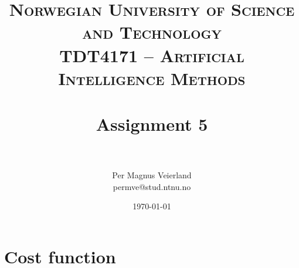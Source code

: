 

\usepackage{pgfplotstable}

\pgfplotsset{compat=1.5}



\newcommand{\errorband}[6]{
\pgfplotstableread{#1}\datatable
  \addplot [name path=pluserror,draw=none,no markers,forget plot]
    table [x={#2},y expr=\thisrow{#3}+\thisrow{#4}] {\datatable};

  \addplot [name path=minuserror,draw=none,no markers,forget plot]
    table [x={#2},y expr=\thisrow{#3}-\thisrow{#4}] {\datatable};

  \addplot [forget plot,fill=#5,opacity=#6]
    fill between[on layer={},of=pluserror and minuserror];

}

\title{
\normalfont \normalsize
\textsc{Norwegian University of Science and Technology\\TDT4171 -- Artificial Intelligence Methods} \\ [25pt]
\horrule{0.5pt} \\[0.4cm]
\huge Assignment 5 \\
\horrule{2pt} \\[0.5cm]
}

\author{Per Magnus Veierland\\permve@stud.ntnu.no}

\date{\normalsize\today}


\maketitle

\section*{Cost function}

